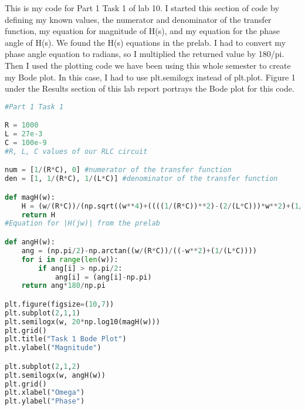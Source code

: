 \documentclass[12pt]{report}
\begin{document}
This is my code for Part 1 Task 1 of lab 10. I started this section of code by defining my known values, the numerator and denominator of the transfer function, my equation for magnitude of H(s), and my equation for the phase angle of H(s). We found the H(s) equations in the prelab. I had to convert my phase angle equation to radians, so I multiplied the returned value by 180/pi. Then I used the plotting code we have been using this whole semester to create my Bode plot. In this case, I had to use plt.semilogx instead of plt.plot. Figure 1 under the Results section of this lab report portrays the Bode plot for this code. 
\begin{lstlisting}[language=Python]
#Part 1 Task 1

R = 1000
L = 27e-3
C = 100e-9
#R, L, C values of our RLC circuit

num = [1/(R*C), 0] #numerator of the transfer function
den = [1, 1/(R*C), 1/(L*C)] #denominator of the transfer function

def magH(w):
    H = (w/(R*C))/(np.sqrt((w**4)+((((1/(R*C))**2)-(2/(L*C)))*w**2)+(1/(L*C))**2))
    return H
#Equation for |H(jw)| from the prelab

def angH(w):
    ang = (np.pi/2)-np.arctan((w/(R*C))/((-w**2)+(1/(L*C))))
    for i in range(len(w)):
        if ang[i] > np.pi/2:
            ang[i] = (ang[i]-np.pi)
    return ang*180/np.pi

plt.figure(figsize=(10,7))
plt.subplot(2,1,1)
plt.semilogx(w, 20*np.log10(magH(w)))
plt.grid()
plt.title("Task 1 Bode Plot")
plt.ylabel("Magnitude")

plt.subplot(2,1,2)
plt.semilogx(w, angH(w))
plt.grid()
plt.xlabel("Omega")
plt.ylabel("Phase")       

\end{lstlisting}
\end{document}
